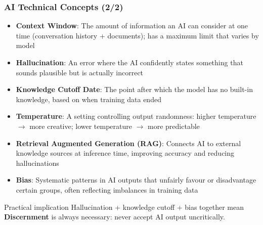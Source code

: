 \begin{frame}[fragile]\frametitle{AI Technical Concepts (2/2)}
      \begin{itemize}
        \item \textbf{Context Window}: The amount of information an AI can consider at one time (conversation history + documents); has a maximum limit that varies by model
        \item \textbf{Hallucination}: An error where the AI confidently states something that sounds plausible but is actually incorrect
        \item \textbf{Knowledge Cutoff Date}: The point after which the model has no built-in knowledge, based on when training data ended
        \item \textbf{Temperature}: A setting controlling output randomness: higher temperature $\rightarrow$ more creative; lower temperature $\rightarrow$ more predictable
        \item \textbf{Retrieval Augmented Generation (RAG)}: Connects AI to external knowledge sources at inference time, improving accuracy and reducing hallucinations
        \item \textbf{Bias}: Systematic patterns in AI outputs that unfairly favour or disadvantage certain groups, often reflecting imbalances in training data
      \end{itemize}
      \vspace{0.4em}
      \begin{alertblock}{Practical implication}
        Hallucination + knowledge cutoff + bias together mean \textbf{Discernment} is always necessary: never accept AI output uncritically.
      \end{alertblock}
\end{frame}

